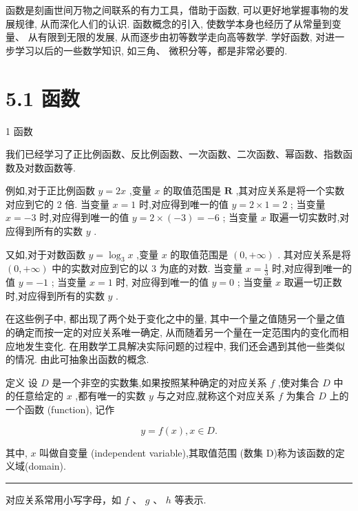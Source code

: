 \documentclass[10pt]{article}
\newcommand{\HRule}{\begin{center}\rule{0.9\linewidth}{0.2mm}\end{center}}
\begin{document}
函数是刻画世间万物之间联系的有力工具，借助于函数, 可以更好地掌握事物的发展规律, 从而深化人们的认识. 函数概念的引入, 使数学本身也经历了从常量到变量、 从有限到无限的发展, 从而逐步由初等数学走向高等数学. 学好函数, 对进一步学习以后的一些数学知识, 如三角、 微积分等，都是非常必要的.

\section*{}

\section*{5.1 函数}

1 函数

我们已经学习了正比例函数、反比例函数、一次函数、二次函数、幂函数、指数函数及对数函数等.

例如,对于正比例函数 \(y = {2x}\) ,变量 \(x\) 的取值范围是 \(\mathbf{R}\) ,其对应关系是将一个实数对应到它的 2 倍. 当变量 \(x = 1\) 时,对应得到唯一的值 \(y = 2 \times  1 = 2\) ; 当变量 \(x =  - 3\) 时,对应得到唯一的值 \(y = 2 \times  \left( {-3}\right)  =  - 6\) ; 当变量 \(x\) 取遍一切实数时,对应得到所有的实数 \(y\) .

又如,对于对数函数 \(y = {\log }_{3}x\) ,变量 \(x\) 的取值范围是 \(\left( {0, + \infty }\right)\) . 其对应关系是将 \(\left( {0, + \infty }\right)\) 中的实数对应到它的以 3 为底的对数. 当变量 \(x = \frac{1}{3}\) 时,对应得到唯一的值 \(y =  - 1\) ; 当变量 \(x = 1\) 时, 对应得到唯一的值 \(y = 0\) ; 当变量 \(x\) 取遍一切正数时,对应得到所有的实数 \(y\) .

在这些例子中, 都出现了两个处于变化之中的量, 其中一个量之值随另一个量之值的确定而按一定的对应关系唯一确定, 从而随着另一个量在一定范围内的变化而相应地发生变化. 在用数学工具解决实际问题的过程中, 我们还会遇到其他一些类似的情况. 由此可抽象出函数的概念.

定义 设 \(D\) 是一个非空的实数集,如果按照某种确定的对应关系 \(f\) ,使对集合 \(D\) 中的任意给定的 \(x\) ,都有唯一的实数 \(y\) 与之对应,就称这个对应关系 \(f\) 为集合 \(D\) 上的一个函数 (function), 记作

\[
y = f\left( x\right) ,x \in  D.
\]

其中, \(x\) 叫做自变量 (independent variable),其取值范围 (数集 D)称为该函数的定义域(domain).



\HRule

对应关系常用小写字母，如 \(f\text{ 、 }g\text{ 、 }h\) 等表示.
\end{document}

